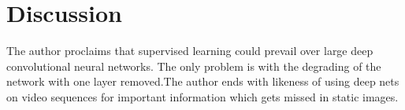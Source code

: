 \documentclass{article}
\begin{document}
\section{Discussion}

The author proclaims that supervised learning could prevail over large deep convolutional neural networks. The only problem is with the degrading of the network with one layer removed.The author ends with likeness of using deep nets on video sequences for important information which gets missed in static images.



\end{document}
